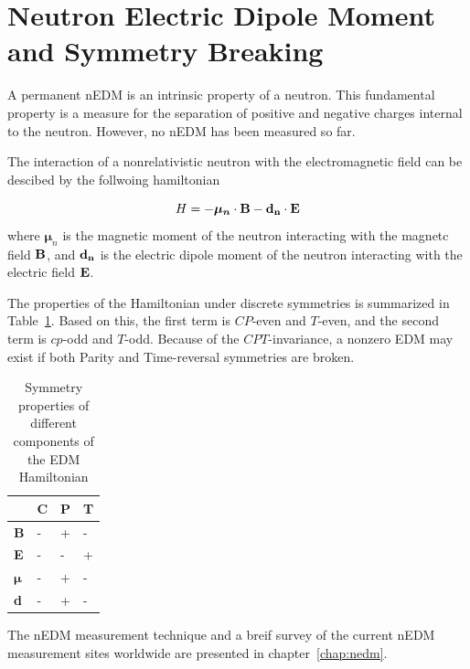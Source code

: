 \section{Neutron Electric Dipole Moment and Symmetry Breaking}
A permanent nEDM is an intrinsic property of a neutron. This
fundamental property is a measure for the separation of positive and
negative charges internal to the neutron. However, no nEDM has been
measured so far.

The interaction of a nonrelativistic neutron with
the electromagnetic field can be descibed by the follwoing
hamiltonian

\begin{equation}
  \label{eqn:hamiltonian}
 H= -\boldsymbol{\mu_n} \cdot \bf{B} - \bf{d}_n \cdot \bf{E}
 \end{equation}
where $\boldsymbol{\mu}_n$ is the magnetic moment of the neutron
interacting with the magnetc field $\bf{B}$, and $\bf{d}_n$ is
the electric dipole moment of the neutron interacting with the
electric field $\bf{E}$.

The properties of the Hamiltonian under discrete symmetries is
summarized in Table~\ref{tab:Hsymmetry}. Based on this, the first term
is $CP$-even and $T$-even, and the second term is $cp$-odd and
$T$-odd. Because of the $CPT$-invariance, a nonzero EDM may exist if
both Parity and Time-reversal symmetries are broken.


\begin{table}[h!]
  \label{tab:Hsymmetry}
\begin{center}
\begin{tabular}{| l | l | l | l |} 
\hline
 & C & P & T \\ \hline
\textbf{B} & - &+ &- \\ \hline
\textbf{E} & -&- &+ \\ \hline
$\boldsymbol{\mu}$ &- &+ &- \\ \hline 
\textbf{d} & -&+ &- \\ \hline
\end{tabular}
\caption{Symmetry properties of different components of the EDM
  Hamiltonian}
\end{center}
\end{table}
  
The nEDM measurement technique and a breif survey of the current nEDM
measurement sites worldwide are presented in chapter~\ref{chap:nedm}.






